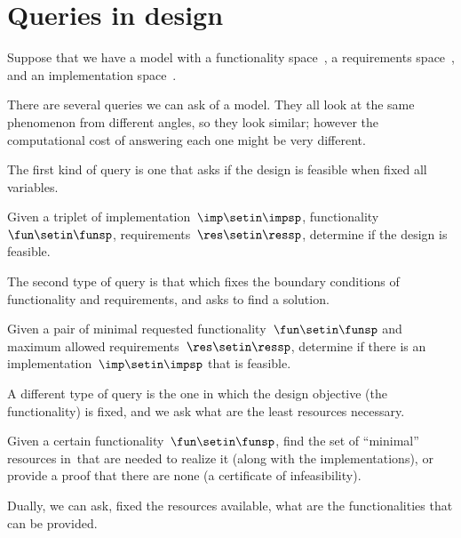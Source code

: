 
\section{Queries in design}


Suppose that we have a model with a functionality space~\funsp, a requirements space~\ressp, and an implementation space~\impsp.

There are several queries we can ask of a model.
They all look at the same phenomenon from different angles, so they look similar;
however the computational cost of answering each one might be very different.

The first kind of query is one that asks if the design is feasible when fixed all variables.

\begin{problem}
Given a triplet of implementation~$\imp\setin\impsp$, functionality~$\fun\setin\funsp$, requirements~$\res\setin\ressp$, determine if the design is feasible.
\end{problem}

The second type of query is that which fixes the boundary conditions of functionality and requirements, and asks to find a solution.

\begin{problem}
Given a pair of minimal requested functionality~$\fun\setin\funsp$ and maximum allowed requirements~$\res\setin\ressp$, determine if there is an implementation~$\imp\setin\impsp$ that is feasible.
\end{problem}

A different type of query is the one in which the design objective (the functionality) is fixed, and we ask what are the least resources necessary.

\begin{problem}[FixFunMinRes]
\label{prob:FixFunMinRes-informal}
Given a certain functionality~$\fun\setin\funsp$, find the set of ``minimal'' resources in~\ressp that are needed to realize it (along with the implementations), or provide a proof that there are none (a certificate of infeasibility).
\end{problem}

Dually, we can ask, fixed the resources available, what are the functionalities that can be provided.


